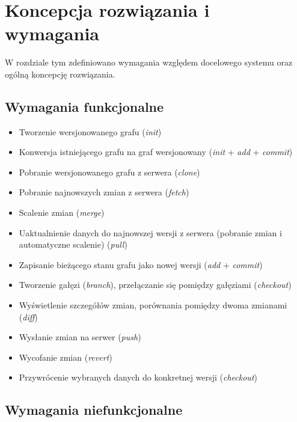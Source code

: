 \chapter{Koncepcja rozwiązania i wymagania}
\label{cha:koncepcja}

W rozdziale tym zdefiniowano wymagania względem docelowego systemu oraz ogólną koncepcję rozwiązania.


\section{Wymagania funkcjonalne}
\label{sec:wymaganiaFunkcjonalne}

\begin{itemize}
\renewcommand{\labelitemi}{$\bullet$}
  \item Tworzenie wersjonowanego grafu (\emph{init})
  \item Konwersja istniejącego grafu na graf wersjonowany (\emph{init} + \emph{add} + \emph{commit})
  \item Pobranie wersjonowanego grafu z serwera (\emph{clone})
  \item Pobranie najnowszych zmian z serwera (\emph{fetch})
  \item Scalenie zmian (\emph{merge})
  \item Uaktualnienie danych do najnowszej wersji z serwera (pobranie zmian i automatyczne scalenie) (\emph{pull})
  \item Zapisanie bieżącego stanu grafu jako nowej wersji (\emph{add} + \emph{commit})
  \item Tworzenie gałęzi (\emph{branch}), przełączanie się pomiędzy gałęziami (\emph{checkout})
  \item Wyświetlenie szczegółów zmian, porównania pomiędzy dwoma zmianami (\emph{diff})
  \item Wysłanie zmian na serwer (\emph{push})
  \item Wycofanie zmian (\emph{revert})
  \item Przywrócenie wybranych danych do konkretnej wersji (\emph{checkout})
\end{itemize}


\section{Wymagania niefunkcjonalne}
\label{sec:wymaganiaNiefunkcjonalne}

